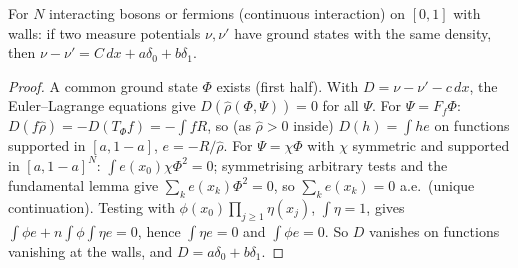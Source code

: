 \begin{theorem}
  \label{thm:line_measureN_hk_full}
  \leanok
  For $N$ interacting bosons or fermions (continuous interaction) on $[0,1]$ with walls: if two measure potentials $\nu,\nu'$ have
  ground states with the same density, then $\nu-\nu'=C\,dx+a\delta_0+b\delta_1$.
\end{theorem}
\begin{proof}
  \leanok
  A common ground state $\Phi$ exists (first half). With $D=\nu-\nu'-c\,dx$, the Euler--Lagrange equations give
  $D(\hat\rho(\Phi,\Psi))=0$ for all $\Psi$. For $\Psi=F_f\Phi$: $D(f\hat\rho)=-D(T_\Phi f)=-\int fR$, so (as $\hat\rho>0$ inside)
  $D(h)=\int he$ on functions supported in $[a,1-a]$, $e=-R/\hat\rho$. For $\Psi=\chi\Phi$ with $\chi$ symmetric and supported in
  $[a,1-a]^N$: $\int e(x_0)\chi\Phi^2=0$; symmetrising arbitrary tests and the fundamental lemma give $\sum_ke(x_k)\Phi^2=0$, so
  $\sum_ke(x_k)=0$ a.e.\ (unique continuation). Testing with $\phi(x_0)\prod_{j\ge1}\eta(x_j)$, $\int\eta=1$, gives
  $\int\phi e+n\int\phi\int\eta e=0$, hence $\int\eta e=0$ and $\int\phi e=0$. So $D$ vanishes on functions vanishing at the
  walls, and $D=a\delta_0+b\delta_1$.
\end{proof}

